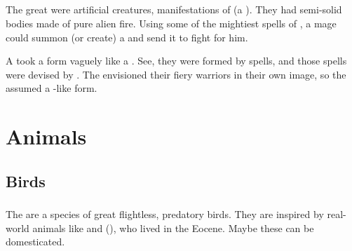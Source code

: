 \section{\Salamander}
The great \salamanders were artificial creatures, manifestations of  (a \xs). 
They had semi-solid bodies made of pure alien fire.
Using some of the mightiest spells of , a mage could summon (or create) a \salamander and send it to fight for him. 

A \salamander took a form vaguely like a \dragon. 
See, they were formed by spells, and those spells were devised by \dragons. 
The \dragons envisioned their fiery warriors in their own image, so the \salamanders assumed a \dragon-like form. 






















 

\chapter{Animals}















\section{Birds}














\subsection{\Grulcan}
The \grulcans{} are a species of great flightless, predatory birds. 
They are inspired by real-world animals like  and  (), who lived in the Eocene. 
Maybe these can be domesticated.

